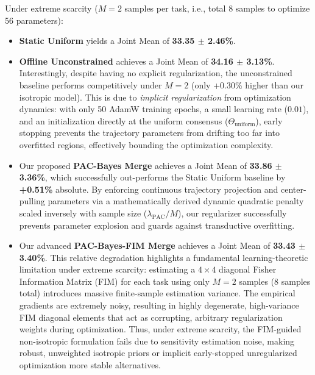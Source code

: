 Under extreme scarcity ($M = 2$ samples per task, i.e., total 8 samples to optimize 56 parameters):
\begin{itemize}
    \item \textbf{Static Uniform} yields a Joint Mean of \textbf{33.35 $\pm$ 2.46\%}.
    \item \textbf{Offline Unconstrained} achieves a Joint Mean of \textbf{34.16 $\pm$ 3.13\%}. Interestingly, despite having no explicit regularization, the unconstrained baseline performs competitively under $M=2$ (only +0.30\% higher than our isotropic model). This is due to \emph{implicit regularization} from optimization dynamics: with only 50 AdamW training epochs, a small learning rate ($0.01$), and an initialization directly at the uniform consensus ($\Theta_{\text{uniform}}$), early stopping prevents the trajectory parameters from drifting too far into overfitted regions, effectively bounding the optimization complexity.
    \item Our proposed \textbf{PAC-Bayes Merge} achieves a Joint Mean of \textbf{33.86 $\pm$ 3.36\%}, which successfully out-performs the Static Uniform baseline by \textbf{+0.51\%} absolute. By enforcing continuous trajectory projection and center-pulling parameters via a mathematically derived dynamic quadratic penalty scaled inversely with sample size ($\lambda_{\text{PAC}}/M$), our regularizer successfully prevents parameter explosion and guards against transductive overfitting.
    \item Our advanced \textbf{PAC-Bayes-FIM Merge} achieves a Joint Mean of \textbf{33.43 $\pm$ 3.40\%}. This relative degradation highlights a fundamental learning-theoretic limitation under extreme scarcity: estimating a $4 \times 4$ diagonal Fisher Information Matrix (FIM) for each task using only $M = 2$ samples (8 samples total) introduces massive finite-sample estimation variance. The empirical gradients are extremely noisy, resulting in highly degenerate, high-variance FIM diagonal elements that act as corrupting, arbitrary regularization weights during optimization. Thus, under extreme scarcity, the FIM-guided non-isotropic formulation fails due to sensitivity estimation noise, making robust, unweighted isotropic priors or implicit early-stopped unregularized optimization more stable alternatives.
\end{itemize}

